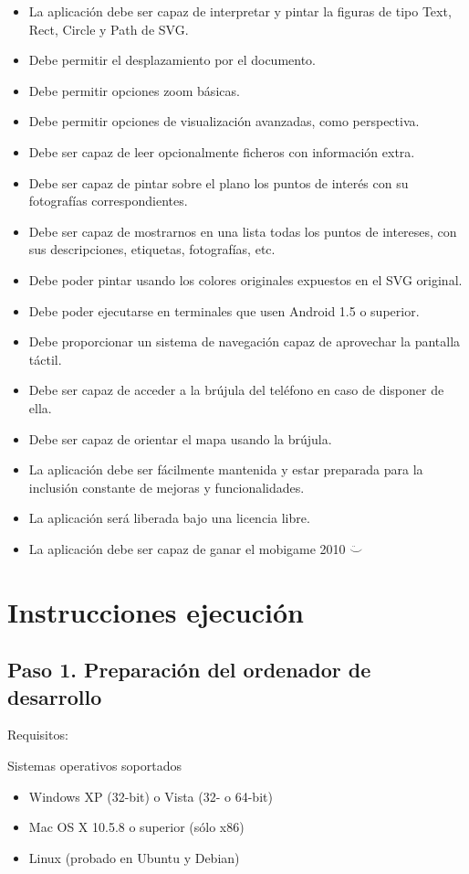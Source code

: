 \documentclass[a4paper,10pt]{article}
\begin{document}
\begin{itemize}
\item La aplicación debe ser capaz de interpretar y pintar la figuras de tipo Text, Rect, 
Circle y Path de SVG.
\item Debe permitir el desplazamiento por el documento.
\item Debe permitir opciones zoom básicas.
\item Debe permitir opciones de visualización avanzadas, como perspectiva.
\item Debe ser capaz de leer opcionalmente ficheros con información extra.
\item Debe ser capaz de pintar sobre el plano los puntos de interés con su fotografías correspondientes.
\item Debe ser capaz de mostrarnos en una lista todas los puntos de intereses, con sus descripciones, etiquetas, fotografías, etc.
\item Debe poder pintar usando los colores originales expuestos en el SVG original.
\item Debe poder ejecutarse en terminales que usen Android 1.5 o superior.
\item Debe proporcionar un sistema de navegación capaz de aprovechar la pantalla táctil.
\item Debe ser capaz de acceder a la brújula del teléfono en caso de disponer de ella.
\item Debe ser capaz de orientar el mapa usando la brújula.
\item La aplicación debe ser fácilmente mantenida y estar preparada para la inclusión constante de mejoras y funcionalidades.
\item La aplicación será liberada bajo una licencia libre.
\item La aplicación debe ser capaz de ganar el mobigame 2010 $\ddot\smile$
\end{itemize}

\clearpage
\section{Instrucciones ejecución}
\subsection{Paso 1. Preparación del ordenador de desarrollo}
Requisitos:

Sistemas operativos soportados
\begin{itemize}
\item Windows XP (32-bit) o Vista (32- o 64-bit)
\item Mac OS X 10.5.8 o superior (sólo x86)
\item Linux (probado en Ubuntu y Debian)
\end{itemize}
\end{document}
